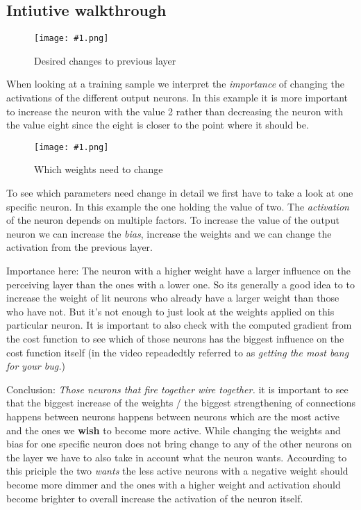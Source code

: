 \documentclass{article}
\newcommand{\img}[1]{
	\centering
	\texttt{[image: \#1.png]}
	\label{#1}
}
\begin{document}
\subsection{Intiutive walkthrough}

\begin{figure}[!htbp]
\img{ai_19}
\caption{Desired changes to previous layer}
\end{figure}

When looking at a training sample we interpret the \textit{importance} of changing the activations of the different output neurons. In this example it is more important to increase the neuron with the value 2 rather than decreasing the neuron with the value eight since the eight is closer to the point where it should be. 


\begin{figure}[!htbp]
\img{ai_20}
\caption{Which weights need to change}
\end{figure}

To see which parameters need change in detail we first have to take a look at one specific neuron. In this example the one holding the value of two. The \textit{activation} of the neuron depends on multiple factors. To increase the value of the output neuron we can increase the \textit{bias}, increase the weights and we can change the activation from the previous layer.

Importance here: The neuron with a higher weight have a larger influence on the perceiving layer than the ones with a lower one. So its generally a good idea to to increase the weight of lit neurons who already have a larger weight than those who have not. But it's not enough to just look at the weights applied on this particular neuron. It is important to also check with the computed gradient from the cost function to see which of those neurons has the biggest influence on the cost function itself (in the video repeadedtly referred to as \textit{getting the most bang for your bug.}) 

Conclusion: \textit{Those neurons that fire together wire together.} it is important to see that the biggest increase of the weights / the biggest strengthening of connections happens between neurons happens between neurons which are the most active and the ones we \textbf{wish} to become more active. While changing the weights and bias for one specific neuron does not bring change to any of the other neurons on the layer we have to also take in account what the neuron wants. Accourding to this priciple the two \textit{wants} the less active neurons with a negative weight should become more dimmer and the ones with a higher weight and activation should become brighter to overall increase the activation of the neuron itself. 
\end{document}
